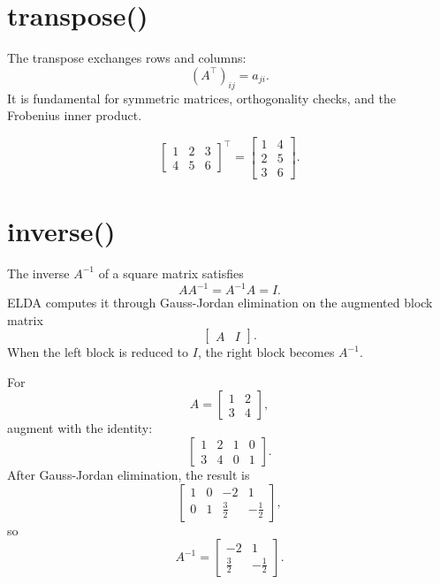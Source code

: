 \documentclass[11pt,a4paper,openany]{book}
\def\code#1{#1}%
\DeclareRobustCommand{\code}[1]{\texttt{\detokenize{#1}}}
\begin{document}
\section{\code{transpose()}}
The transpose exchanges rows and columns:
\[
(A^\top)_{ij} = a_{ji}.
\]
It is fundamental for symmetric matrices, orthogonality checks, and the Frobenius inner product.

\begin{examplebox}[Example]
\[
\begin{bmatrix}
1 & 2 & 3 \\
4 & 5 & 6
\end{bmatrix}^\top
=
\begin{bmatrix}
1 & 4 \\
2 & 5 \\
3 & 6
\end{bmatrix}.
\]
\end{examplebox}

\section{\code{inverse()}}
The inverse \(A^{-1}\) of a square matrix satisfies
\[
AA^{-1} = A^{-1}A = I.
\]
ELDA computes it through Gauss-Jordan elimination on the augmented block matrix
\[
\left[\begin{array}{c|c}
A & I
\end{array}\right].
\]
When the left block is reduced to \(I\), the right block becomes \(A^{-1}\).

\begin{examplebox}[Example]
For
\[
A =
\begin{bmatrix}
1 & 2 \\
3 & 4
\end{bmatrix},
\]
augment with the identity:
\[
\left[
\begin{array}{cc|cc}
1 & 2 & 1 & 0 \\
3 & 4 & 0 & 1
\end{array}
\right].
\]
After Gauss-Jordan elimination, the result is
\[
\left[
\begin{array}{cc|cc}
1 & 0 & -2 & 1 \\
0 & 1 & \frac{3}{2} & -\frac{1}{2}
\end{array}
\right],
\]
so
\[
A^{-1} =
\begin{bmatrix}
-2 & 1 \\
\frac{3}{2} & -\frac{1}{2}
\end{bmatrix}.
\]
\end{examplebox}
\end{document}
